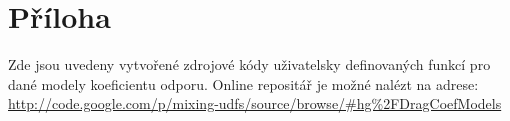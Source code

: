 \chapter*{Příloha}
\label{sec:priloha}
Zde jsou uvedeny vytvořené zdrojové kódy uživatelsky definovaných funkcí pro dané modely koeficientu odporu. Online repositář je možné nalézt na adrese:\\ \href{http://code.google.com/p/mixing-udfs/source/browse/\#hg\%2FDragCoefModels}{http://code.google.com/p/mixing-udfs/source/browse/\#hg\%2FDragCoefModels}





